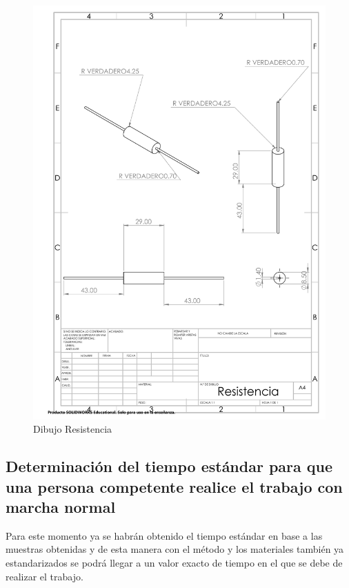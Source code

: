 \begin{figure}[H]
    \centering
    \includegraphics[scale=0.4]{10/Img/cotasResistencia.pdf}
    \caption{Dibujo Resistencia}
    \label{fig:cotasResistencia.png}
\end{figure}
%
%
\subsection{Determinación del tiempo estándar para que una persona competente realice el trabajo con marcha normal}

Para este momento ya se habrán obtenido el tiempo estándar en base a las muestras obtenidas y de esta manera con el método y los materiales también ya estandarizados se podrá llegar a un valor exacto de tiempo en el que se debe de realizar el trabajo.
%
%

